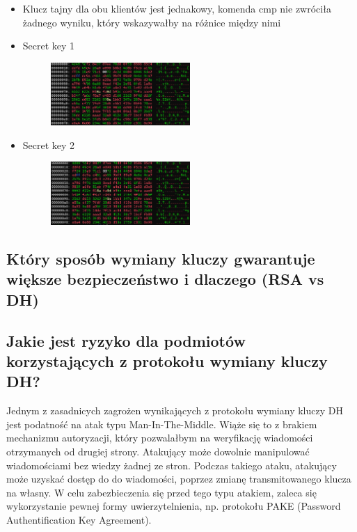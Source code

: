 \documentclass{article}
\begin{document}
\begin{itemize}
\begin{figure}[H]
        \end{figure}
  \item Klucz tajny dla obu klientów jest jednakowy, komenda cmp nie zwróciła żadnego wyniku, który wskazywałby na różnice między nimi
  \item Secret key 1
        \begin{figure}[H]
          \centering
          \includegraphics[width=0.5\textwidth]{secret_key1.png}
        \end{figure}
  \item Secret key 2
        \begin{figure}[H]
          \centering
          \includegraphics[width=0.5\textwidth]{secret_key2.png}
        \end{figure}
\end{itemize}

\subsection{Który sposób wymiany kluczy gwarantuje większe bezpieczeństwo i dlaczego (RSA vs DH)}
\subsection{Jakie jest ryzyko dla podmiotów korzystających z protokołu wymiany kluczy DH?}
Jednym z zasadnicych zagrożen wynikających z protokołu wymiany kluczy DH jest podatność na atak typu Man-In-The-Middle. Wiąże się to z brakiem
mechanizmu autoryzacji, który pozwalałbym na weryfikację wiadomości otrzymanych od drugiej strony. Atakujący może dowolnie manipulować wiadomościami bez wiedzy żadnej ze stron.
Podczas takiego ataku, atakujący może uzyskać dostęp do do wiadomości, poprzez zmianę transmitowanego klucza na własny. W celu zabezbieczenia się przed tego typu atakiem,
zaleca się wykorzystanie pewnej formy uwierzytelnienia, np. protokołu PAKE (Password Authentification Key Agreement).
\end{document}
